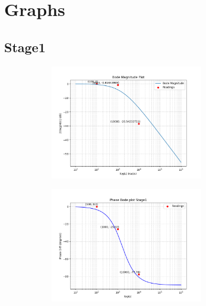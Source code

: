 \documentclass[a4paper,12pt]{article}
\begin{document}
\section*{Graphs}
\subsection*{Stage1}
\begin{figure}[H]
    \centering
    \begin{subfigure}{0.5\textwidth}
        \centering
        \includegraphics[height=5cm]{figs/Stage1/Magn.png}
    \end{subfigure}%
    \begin{subfigure}{0.5\textwidth}
        \centering
        \includegraphics[height=5cm]{figs/Stage1/Phase.png}
    \end{subfigure}
\end{figure}
\end{document}
